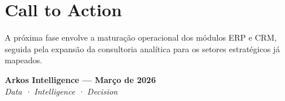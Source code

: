 \documentclass[12pt,a4paper,oneside]{report}
\begin{document}
\section{Call to Action}
A próxima fase envolve a maturação operacional dos módulos ERP e CRM, seguida pela expansão da consultoria analítica para os setores estratégicos já mapeados.

\vspace{2cm}

\begin{center}
    \textbf{Arkos Intelligence — Março de 2026}\\
    \textit{Data · Intelligence · Decision}
\end{center}
\end{document}

